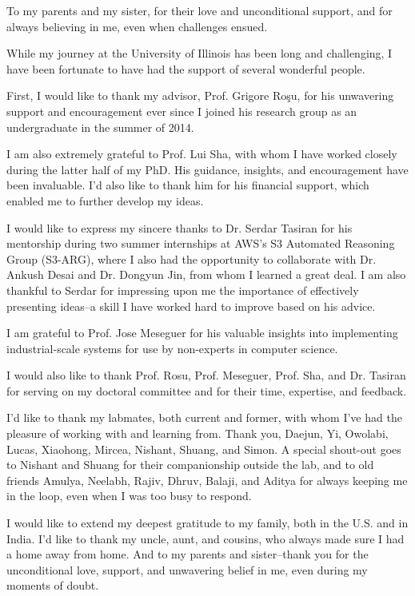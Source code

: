 \documentclass[edeposit,tocnosub,noragright,centerchapter,fullpagesingle,12pt]{uiuc_csthesis21}
\theoremstyle{definition}
\numberwithin{algocf}{chapter}     %
\begin{document}
%
\begin{dedication}
To my parents and my sister,
for their love and unconditional support,
and for always believing in me, even when challenges ensued.
\end{dedication}

%
\begin{acknowledgments}

While my journey at the University of Illinois has been long and challenging,
  I have been fortunate to have had the support of several wonderful people.

  First, I would like to thank my advisor, Prof. Grigore Ro\c{s}u,
  for his unwavering support and encouragement ever since I joined his research group as an undergraduate in the summer of 2014.

I am also extremely grateful to Prof. Lui Sha,
  with whom I have worked closely during the latter half of my PhD.
  His guidance, insights, and encouragement have been invaluable.
  I’d also like to thank him for his financial support, which enabled me to further develop my ideas.

I would like to express my sincere thanks to
  Dr. Serdar Tasiran for his mentorship during two summer internships at AWS’s S3 Automated Reasoning Group (S3-ARG),
  where I also had the opportunity to collaborate with Dr. Ankush Desai and Dr. Dongyun Jin,
  from whom I learned a great deal.
  I am also thankful to Serdar for impressing upon me the importance of
  effectively presenting ideas--a skill I have worked hard to improve based on his advice.

I am grateful to Prof. Jose Meseguer for his valuable insights
into implementing industrial-scale systems for use by non-experts in computer science.

I would also like to thank Prof. Rosu, Prof. Meseguer, Prof. Sha,
  and Dr. Tasiran for serving on my doctoral committee and for their time, expertise, and feedback.

I’d like to thank my labmates,
  both current and former, with whom I’ve had the pleasure of working with and learning from.
  Thank you, Daejun, Yi, Owolabi, Lucas, Xiaohong, Mircea, Nishant, Shuang, and Simon.
  A special shout-out goes to Nishant and Shuang for their companionship outside the lab,
  and to old friends Amulya, Neelabh, Rajiv, Dhruv, Balaji, and Aditya for always keeping me in the loop,
  even when I was too busy to respond.

I would like to extend my deepest gratitude to my family,
  both in the U.S. and in India.
I'd like to thank my uncle, aunt, and cousins, who always made sure I had a home away from home.
And to my parents and sister--thank you for the unconditional love, support, and unwavering belief in me, even during my moments of doubt.



\end{acknowledgments}
\end{document}
